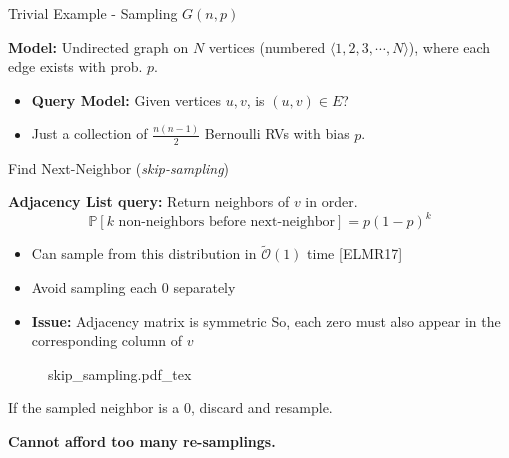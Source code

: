 \begin{block}{Trivial Example - Sampling $G(n, p)$}

\textbf{Model:} Undirected graph on $N$ vertices (numbered $\langle 1, 2, 3, \cdots, N\rangle$),
where each edge exists with prob. $p$.


\begin{itemize}
    \item [] \textbf{Query Model:} Given vertices $u, v$, is $(u,v)\in E$?
    \item Just a collection of $\frac{n(n-1)}{2}$ Bernoulli RVs with bias $p$.
\end{itemize}

\end{block}

\begin{block}{Find Next-Neighbor (\emph{skip-sampling})}

\textbf{Adjacency List query:} Return neighbors of $v$ in order.
\[ \mathbb P[k \textrm{ non-neighbors before next-neighbor}] = p(1-p)^k \]
\vspace{-3.5ex}
\begin{itemize}
    \item Can sample from this distribution in $\tilde{\mathcal O}(1)$ time [ELMR17]
    \item Avoid sampling each $0$ separately
    \item [] \textbf{Issue:} Adjacency matrix is symmetric
          So, each zero must also appear in the corresponding column of $v$
\end{itemize}

\begin{figure}[h!]\centering
    \def\svgwidth{1.0\columnwidth}
    {skip_sampling.pdf_tex}
\end{figure}
If the sampled neighbor is a $0$, discard and resample.

\textbf{Cannot afford too many re-samplings.}

\end{block}
